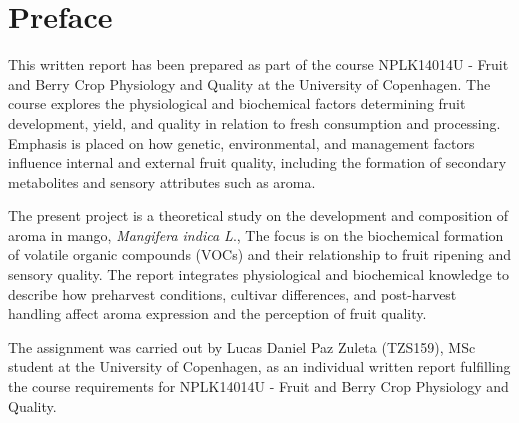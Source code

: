 \setlength{\headheight}{12.71342pt}
\addtolength{\topmargin}{-0.71342pt}


\section*{Preface}
This written report has been prepared as part of the course NPLK14014U - Fruit and Berry Crop Physiology and Quality at the University of Copenhagen. The course explores the physiological and biochemical factors determining fruit development, yield, and quality in relation to fresh consumption and processing. Emphasis is placed on how genetic, environmental, and management factors influence internal and external fruit quality, including the formation of secondary metabolites and sensory attributes such as aroma.

\vspace{1em}
The present project is a theoretical study on the development and composition of aroma in mango, \textit{Mangifera indica L}., The focus is on the biochemical formation of volatile organic compounds (VOCs) and their relationship to fruit ripening and sensory quality. The report integrates physiological and biochemical knowledge to describe how preharvest conditions, cultivar differences, and post-harvest handling affect aroma expression and the perception of fruit quality.

\vspace{1em}
The assignment was carried out by Lucas Daniel Paz Zuleta (TZS159), MSc student at the University of Copenhagen, as an individual written report fulfilling the course requirements for NPLK14014U - Fruit and Berry Crop Physiology and Quality.

\vspace{1.5em}
